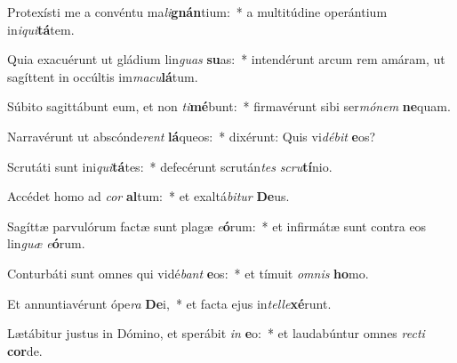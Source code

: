 \item Protexísti me a convéntu ma\textit{li}\textbf{gnán}tium:~* a multitúdine operántium in\textit{i}\textit{qui}\textbf{tá}tem.
\item Quia exacuérunt ut gládium lin\textit{guas} \textbf{su}as:~* intendérunt arcum rem amáram, ut sagíttent in occúltis im\textit{ma}\textit{cu}\textbf{lá}tum.
\item Súbito sagittábunt eum, et non \textit{ti}\textbf{mé}bunt:~* firmavérunt sibi ser\textit{mó}\textit{nem} \textbf{ne}quam.
\item Narravérunt ut abscónde\textit{rent} \textbf{lá}queos:~* dixérunt: Quis vi\textit{dé}\textit{bit} \textbf{e}os?
\item Scrutáti sunt ini\textit{qui}\textbf{tá}tes:~* defecérunt scrután\textit{tes} \textit{scru}\textbf{tí}nio.
\item Accédet homo ad \textit{cor} \textbf{al}tum:~* et exaltá\textit{bi}\textit{tur} \textbf{De}us.
\item Sagíttæ parvulórum factæ sunt plagæ \textit{e}\textbf{ó}rum:~* et infirmátæ sunt contra eos lin\textit{guæ} \textit{e}\textbf{ó}rum.
\item Conturbáti sunt omnes qui vidé\textit{bant} \textbf{e}os:~* et tímuit \textit{om}\textit{nis} \textbf{ho}mo.
\item Et annuntiavérunt ópe\textit{ra} \textbf{De}i,~* et facta ejus in\textit{tel}\textit{le}\textbf{xé}runt.
\item Lætábitur justus in Dómino, et sperábit \textit{in} \textbf{e}o:~* et laudabúntur omnes \textit{rec}\textit{ti} \textbf{cor}de.
